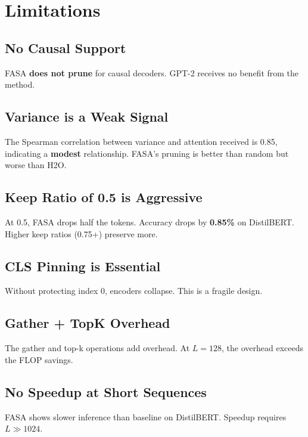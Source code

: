 
\section{Limitations}

\subsection{No Causal Support}

FASA \textbf{does not prune} for causal decoders. GPT-2 receives no benefit 
from the method.

\subsection{Variance is a Weak Signal}

The Spearman correlation between variance and attention received is 
0.85, indicating a \textbf{modest} relationship. FASA's pruning is 
better than random but worse than H2O.

\subsection{Keep Ratio of 0.5 is Aggressive}

At 0.5, FASA drops half the tokens. Accuracy drops by \textbf{0.85\%} on 
DistilBERT. Higher keep ratios (0.75+) preserve more.

\subsection{CLS Pinning is Essential}

Without protecting index 0, encoders collapse. This is a fragile design.

\subsection{Gather + TopK Overhead}

The gather and top-k operations add overhead. At $L = 128$, the overhead 
exceeds the FLOP savings.

\subsection{No Speedup at Short Sequences}

FASA shows slower inference than baseline on DistilBERT. Speedup requires 
$L \gg 1024$.

